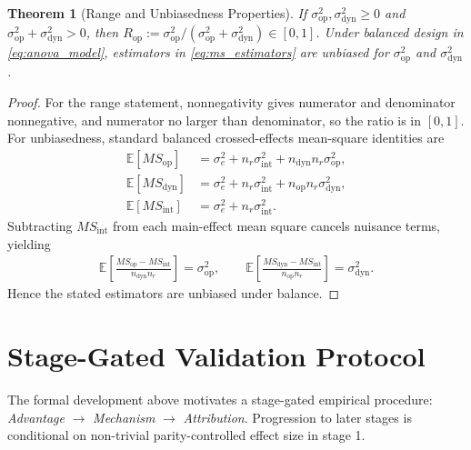 \documentclass{article} %
\newtheorem{theorem}{Theorem}[section]
\begin{document}
\begin{theorem}[Range and Unbiasedness Properties]
\label{thm:range_unbiased}
If $\sigma_{\mathrm{op}}^2,\sigma_{\mathrm{dyn}}^2\ge 0$ and $\sigma_{\mathrm{op}}^2+\sigma_{\mathrm{dyn}}^2>0$, then
$R_{\mathrm{op}}:=\sigma_{\mathrm{op}}^2/(\sigma_{\mathrm{op}}^2+\sigma_{\mathrm{dyn}}^2)\in[0,1]$.
Under balanced design in \eqref{eq:anova_model}, estimators in \eqref{eq:ms_estimators} are unbiased for $\sigma_{\mathrm{op}}^2$ and $\sigma_{\mathrm{dyn}}^2$.
\end{theorem}
\begin{proof}
For the range statement, nonnegativity gives numerator and denominator nonnegative, and numerator no larger than denominator, so the ratio is in $[0,1]$.
For unbiasedness, standard balanced crossed-effects mean-square identities are
\begin{align*}
\mathbb{E}[MS_{\mathrm{op}}]&=\sigma_e^2+n_r\sigma_{\mathrm{int}}^2+n_{\mathrm{dyn}}n_r\sigma_{\mathrm{op}}^2,\\
\mathbb{E}[MS_{\mathrm{dyn}}]&=\sigma_e^2+n_r\sigma_{\mathrm{int}}^2+n_{\mathrm{op}}n_r\sigma_{\mathrm{dyn}}^2,\\
\mathbb{E}[MS_{\mathrm{int}}]&=\sigma_e^2+n_r\sigma_{\mathrm{int}}^2.
\end{align*}
Subtracting $MS_{\mathrm{int}}$ from each main-effect mean square cancels nuisance terms, yielding
\begin{align*}
\mathbb{E}\!\left[\frac{MS_{\mathrm{op}}-MS_{\mathrm{int}}}{n_{\mathrm{dyn}}n_r}\right]=\sigma_{\mathrm{op}}^2,\qquad
\mathbb{E}\!\left[\frac{MS_{\mathrm{dyn}}-MS_{\mathrm{int}}}{n_{\mathrm{op}}n_r}\right]=\sigma_{\mathrm{dyn}}^2.
\end{align*}
Hence the stated estimators are unbiased under balance.
\end{proof}

\section{Stage-Gated Validation Protocol}
\label{sec:protocol}
The formal development above motivates a stage-gated empirical procedure: \emph{Advantage} $\rightarrow$ \emph{Mechanism} $\rightarrow$ \emph{Attribution}. Progression to later stages is conditional on non-trivial parity-controlled effect size in stage 1.
\end{document}
